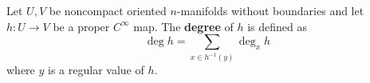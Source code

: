 Let $U, V$ be noncompact oriented $n$-manifolds without boundaries and let $h \colon U \to V$ be a proper $C^{\infty}$ map. The \textbf{degree} of $h$ is defined as
$$
\deg h = \sum_{x \in h^{-1}(y)} \deg_{x} h
$$
where $y$ is a regular value of $h$.
